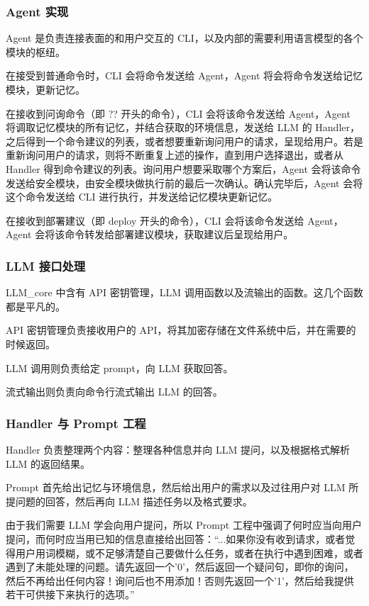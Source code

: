 \documentclass{article}
\theoremstyle{plain}
\theoremstyle{definition}
\theoremstyle{remark}
\begin{document}
\subsubsection{Agent 实现}

Agent 是负责连接表面的和用户交互的 CLI，以及内部的需要利用语言模型的各个模块的枢纽。

在接受到普通命令时，CLI 会将命令发送给 Agent，Agent 将会将命令发送给记忆模块，更新记忆。

在接收到问询命令（即 ?? 开头的命令），CLI 会将该命令发送给 Agent，Agent 将调取记忆模块的所有记忆，并结合获取的环境信息，发送给 LLM 的 Handler，之后得到一个命令建议的列表，或者想要重新询问用户的请求，呈现给用户。若是重新询问用户的请求，则将不断重复上述的操作，直到用户选择退出，或者从 Handler 得到命令建议的列表。询问用户想要采取哪个方案后，Agent 会将该命令发送给安全模块，由安全模块做执行前的最后一次确认。确认完毕后，Agent 会将这个命令发送给 CLI 进行执行，并发送给记忆模块更新记忆。

在接收到部署建议（即 deploy 开头的命令），CLI 会将该命令发送给 Agent，Agent 会将该命令转发给部署建议模块，获取建议后呈现给用户。

\subsubsection{LLM 接口处理}

LLM\_core 中含有 API 密钥管理，LLM 调用函数以及流输出的函数。这几个函数都是平凡的。

API 密钥管理负责接收用户的 API，将其加密存储在文件系统中后，并在需要的时候返回。

LLM 调用则负责给定 prompt，向 LLM 获取回答。

流式输出则负责向命令行流式输出 LLM 的回答。

\subsubsection{Handler 与 Prompt 工程}

Handler 负责整理两个内容：整理各种信息并向 LLM 提问，以及根据格式解析 LLM 的返回结果。

Prompt 首先给出记忆与环境信息，然后给出用户的需求以及过往用户对 LLM 所提问题的回答，然后再向 LLM 描述任务以及格式要求。

由于我们需要 LLM 学会向用户提问，所以 Prompt 工程中强调了何时应当向用户提问，而何时应当用已知的信息直接给出回答：“...如果你没有收到请求，或者觉得用户用词模糊，或不足够清楚自己要做什么任务，或者在执行中遇到困难，或者遇到了未能处理的问题。请先返回一个'0'，然后返回一个疑问句，即你的询问，然后不再给出任何内容！询问后也不用添加{}！否则先返回一个'1'，然后给我提供若干可供接下来执行的选项。”
\end{document}
